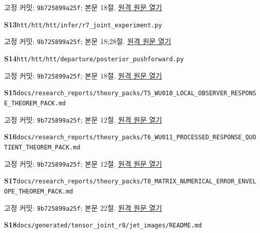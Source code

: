 \documentclass[11pt,a4paper]{article}
\begin{document}
{\small 고정 커밋: \texttt{9b725899a25f}; 본문 18절. \href{https://github.com/cosmosapjw-quantum/htt_base/blob/9b725899a25fa410e7c3686ce36afaa667d14646/htt/htt/htt/infer/r7_gaussian_law.py}{원격 원문 열기}}\par
\hypertarget{src:S13}{}\textbf{S13}\quad \nolinkurl{htt/htt/htt/infer/r7_joint_experiment.py}\par
{\small 고정 커밋: \texttt{9b725899a25f}; 본문 18;28절. \href{https://github.com/cosmosapjw-quantum/htt_base/blob/9b725899a25fa410e7c3686ce36afaa667d14646/htt/htt/htt/infer/r7_joint_experiment.py}{원격 원문 열기}}\par
\hypertarget{src:S14}{}\textbf{S14}\quad \nolinkurl{htt/htt/htt/departure/posterior_pushforward.py}\par
{\small 고정 커밋: \texttt{9b725899a25f}; 본문 18절. \href{https://github.com/cosmosapjw-quantum/htt_base/blob/9b725899a25fa410e7c3686ce36afaa667d14646/htt/htt/htt/departure/posterior_pushforward.py}{원격 원문 열기}}\par
\hypertarget{src:S15}{}\textbf{S15}\quad \nolinkurl{docs/research_reports/theory_packs/T5_WU010_LOCAL_OBSERVER_RESPONSE_THEOREM_PACK.md}\par
{\small 고정 커밋: \texttt{9b725899a25f}; 본문 12절. \href{https://github.com/cosmosapjw-quantum/htt_base/blob/9b725899a25fa410e7c3686ce36afaa667d14646/docs/research_reports/theory_packs/T5_WU010_LOCAL_OBSERVER_RESPONSE_THEOREM_PACK.md}{원격 원문 열기}}\par
\hypertarget{src:S16}{}\textbf{S16}\quad \nolinkurl{docs/research_reports/theory_packs/T6_WU011_PROCESSED_RESPONSE_QUOTIENT_THEOREM_PACK.md}\par
{\small 고정 커밋: \texttt{9b725899a25f}; 본문 12절. \href{https://github.com/cosmosapjw-quantum/htt_base/blob/9b725899a25fa410e7c3686ce36afaa667d14646/docs/research_reports/theory_packs/T6_WU011_PROCESSED_RESPONSE_QUOTIENT_THEOREM_PACK.md}{원격 원문 열기}}\par
\hypertarget{src:S17}{}\textbf{S17}\quad \nolinkurl{docs/research_reports/theory_packs/T8_MATRIX_NUMERICAL_ERROR_ENVELOPE_THEOREM_PACK.md}\par
{\small 고정 커밋: \texttt{9b725899a25f}; 본문 22절. \href{https://github.com/cosmosapjw-quantum/htt_base/blob/9b725899a25fa410e7c3686ce36afaa667d14646/docs/research_reports/theory_packs/T8_MATRIX_NUMERICAL_ERROR_ENVELOPE_THEOREM_PACK.md}{원격 원문 열기}}\par
\hypertarget{src:S18}{}\textbf{S18}\quad \nolinkurl{docs/generated/tensor_joint_r8/jet_images/README.md}\par
\end{document}
